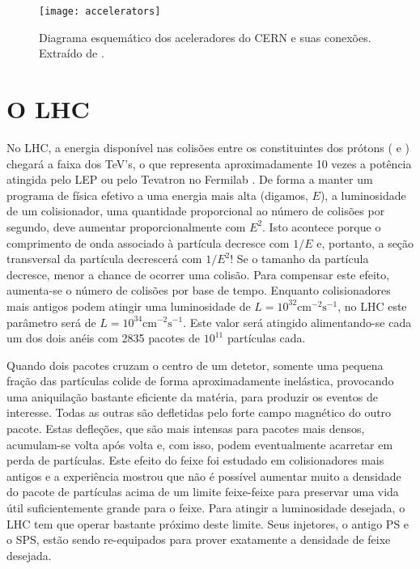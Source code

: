 \begin{figure}
\begin{center}
\texttt{[image: accelerators]}
\end{center}
\caption{Diagrama esquemático dos aceleradores do CERN e suas
conexões. Extraído de \cite{cern}.}
\label{fig:accel}
\end{figure}

\section{O LHC}

No LHC, a energia disponível nas colisões entre os constituintes dos prótons
( e ) chegará a faixa dos TeV's, o que
representa aproximadamente 10 vezes a potência atingida pelo LEP ou pelo
Tevatron no Fermilab \cite{lhc}. De forma a manter um programa de física
efetivo a uma energia mais alta (digamos, $E$), a luminosidade de um
colisionador, uma quantidade proporcional ao número de colisões por segundo,
deve aumentar proporcionalmente com $E^2$. Isto acontece porque o comprimento
de onda associado à partícula decresce com $1/E$ e, portanto, a seção
transversal da partícula decrescerá com $1/E^2$! Se o tamanho da partícula
decresce, menor a chance de ocorrer uma colisão. Para compensar este efeito,
aumenta-se o número de colisões por base de tempo. Enquanto colisionadores
mais antigos podem atingir uma luminosidade de $L = 10^{32}
\text{cm}^{-2}\text{s}^{-1}$, no LHC este parâmetro será de $L = 10^{34}
\text{cm}^{-2}\text{s}^{-1}$. Este valor será atingido alimentando-se cada um dos
dois anéis com 2835 pacotes de $10^{11}$ partículas cada.

Quando dois pacotes cruzam o centro de um detetor, somente uma pequena fração
das partículas colide de forma aproximadamente inelástica, provocando uma
aniquilação bastante eficiente da matéria, para produzir os eventos de
interesse. Todas as outras são defletidas pelo forte campo magnético do outro
pacote. Estas defleções, que são mais intensas para pacotes mais densos,
acumulam-se volta após volta e, com isso, podem eventualmente acarretar em
perda de partículas. Este efeito do feixe foi estudado em colisionadores mais
antigos e a experiência mostrou que não é possível aumentar muito a densidade
do pacote de partículas acima de um limite feixe-feixe para preservar uma vida
útil suficientemente grande para o feixe. Para atingir a luminosidade
desejada, o LHC tem que operar bastante próximo deste limite. Seus injetores,
o antigo PS e o SPS, estão sendo re-equipados para prover exatamente a
densidade de feixe desejada.

